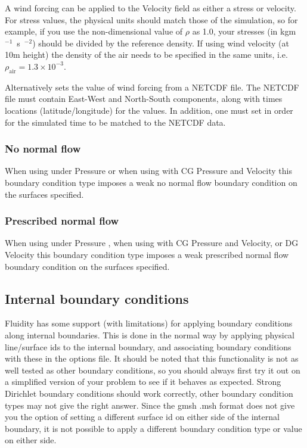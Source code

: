 A wind forcing can be applied to the Velocity field as either a stress or
velocity. For stress values, the physical units should match those of the
simulation, so for example, if you use the non-dimensional value of $\rho$
as 1.0, your stresses (in \unit{kgm\ensuremath{^{-1}}s\ensuremath{^{-2}}})
should be divided by the reference density.  If using wind velocity
(at 10m height) the density of the air needs to be specified in the same
units, i.e. $\rho_{\textrm{air}} = 1.3\times10^{-3}$.

Alternatively
sets the value of wind forcing from a NETCDF file. The NETCDF file must
contain East-West and North-South components, along with times locations
(latitude/longitude) for the values. In addition, one must set
 in order for the simulated
time to be matched to the NETCDF data.

\subsubsection{No normal flow}

When using  under Pressure  or when using 
 with CG Pressure and Velocity this boundary condition type 
imposes a weak no normal flow boundary condition on the surfaces specified.

\subsubsection{Prescribed normal flow}

When using  under Pressure , when using 
 with CG Pressure and Velocity, or DG Velocity this boundary condition type 
imposes a weak prescribed normal flow boundary condition on the surfaces specified.


\subsection{Internal boundary conditions}\label{sec:internal_bcs}
Fluidity has some support (with limitations) for applying boundary conditions
along internal boundaries. This is done in the normal way 
by applying physical line/surface ids to the internal boundary, and associating
boundary conditions with these in the options file. It should be
noted that this functionality is not as well tested as other boundary
conditions, so you should always first try it out on a simplified version of
your problem to see if it behaves as expected. Strong Dirichlet boundary
conditions should work correctly, other boundary condition types may not give
the right answer. Since the gmsh .msh format does not give you the
option of setting a different surface id on either side of the internal
boundary, it is not possible to apply a different boundary condition type or
value on either side.


